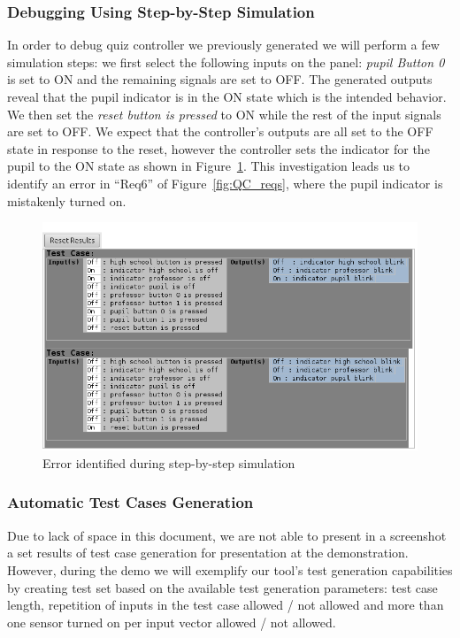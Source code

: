 \subsubsection{Debugging Using Step-by-Step Simulation}
In order to debug quiz controller we previously generated we will perform a few
simulation steps: we first select the following inputs on the panel:
\emph{pupil Button 0} is set to \textsf{ON} and the remaining signals are set to
\textsf{OFF}.
The generated outputs reveal that the pupil indicator is in the \textsf{ON}
state which is the intended behavior. We then set the \emph{reset button
is pressed} to \textsf{ON} while the rest of the input signals are
set to \textsf{OFF}.
We expect that the controller's outputs are all set to the \textsf{OFF} state
in response to the reset, however the controller sets the indicator for the
pupil to the \textsf{ON} state as shown in Figure~\ref{fig:simError}. This investigation leads us to identify
an error in ``Req6'' of Figure~\ref{fig:QC_reqs}, where the pupil indicator is mistakenly turned on.
 \begin{figure}[!h]
\centering
\includegraphics[width=1\textwidth]{./images/Simulation_Error.png}
\caption{Error identified during step-by-step simulation}
\label{fig:simError}
\vspace{-.6cm}
\end{figure}
\subsubsection{Automatic Test Cases Generation} 
\vspace{-.5cm}
Due to lack of space in this document, we are not able to present in a
screenshot a set results of test case generation for presentation at the
demonstration. However, during the demo we will exemplify our tool's test
generation capabilities by creating test set based on the available test generation parameters: test case length, repetition of
inputs in the test case allowed / not allowed and more than one sensor turned on
per input vector allowed / not allowed.
